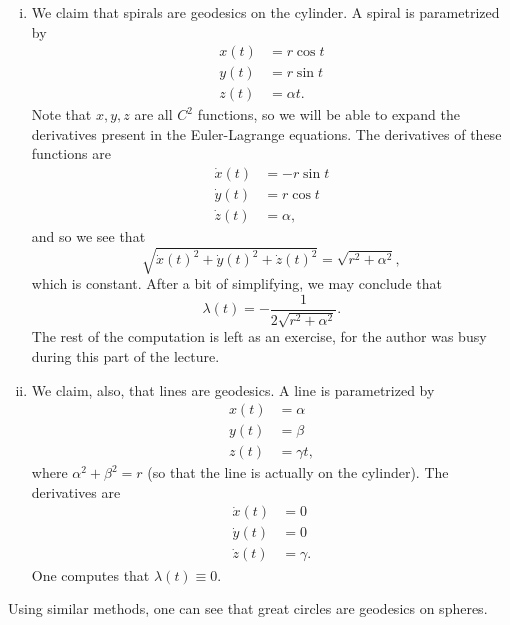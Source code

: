\documentclass[11pt]{article}
\begin{document}
\begin{enumerate}
\begin{enumerate}[(i)]
\item
We claim that spirals are geodesics on the cylinder. A spiral is parametrized by
\begin{align*}
x(t) &= r \cos t \\
y(t) &= r \sin t \\
z(t) &= \alpha t.
\end{align*}
Note that $x, y, z$ are all $C^2$ functions, so we will be able to expand the derivatives present in the Euler-Lagrange equations. The derivatives of these functions are
\begin{align*}
\dot{x}(t) &= -r \sin t \\
\dot{y}(t) &= r \cos t \\
\dot{z}(t) &= \alpha,
\end{align*}
and so we see that
\[
\sqrt{\dot{x}(t)^2 + \dot{y}(t)^2 + \dot{z}(t)^2} = \sqrt{r^2 + \alpha^2},
\]
which is constant. After a bit of simplifying, we may conclude that
\[
\lambda(t) = -\frac{1}{2\sqrt{r^2 + \alpha^2}}.
\]
The rest of the computation is left as an exercise, for the author was busy during this part of the lecture.

\item
We claim, also, that lines are geodesics. A line is parametrized by
\begin{align*}
x(t) &= \alpha \\
y(t) &= \beta \\
z(t) &= \gamma t,
\end{align*}
where $\alpha^2 + \beta^2 = r$ (so that the line is actually on the cylinder). The derivatives are
\begin{align*}
\dot{x}(t) &= 0 \\
\dot{y}(t) &= 0 \\
\dot{z}(t) &= \gamma.
\end{align*}
One computes that $\lambda(t) \equiv 0.$
\end{enumerate}
Using similar methods, one can see that great circles are geodesics on spheres.


\end{enumerate}
\end{document}
